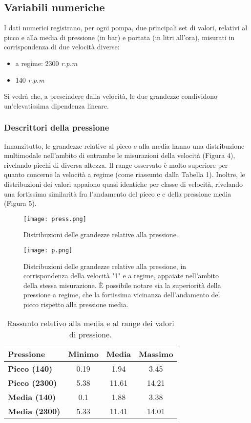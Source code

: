 \documentclass[fleqn,10pt]{SelfArx} %
\begin{document}
\subsection{Variabili numeriche}
I dati numerici registrano, per ogni pompa, due principali set di valori, relativi al picco e alla media di pressione (in bar) e portata (in litri all'ora), misurati in corrispondenza di due velocità diverse:
\begin{itemize}
    \item a regime: 2300 \textit{r.p.m}
    \item 140 \textit{r.p.m}
\end{itemize}
Si vedrà che, a prescindere dalla velocità, le due grandezze condividono un'elevatissima dipendenza lineare.
\subsubsection{Descrittori della pressione}
Innanzitutto, le grandezze relative al picco e alla media hanno una distribuzione multimodale nell'ambito di entrambe le misurazioni della velocità (Figura 4), rivelando picchi di diversa altezza. Il range osservato è molto superiore per quanto concerne la velocità a regime (come riassunto dalla Tabella 1). Inoltre, le distribuzioni dei valori appaiono quasi identiche per classe di velocità, rivelando una fortissima similarità fra l'andamento del picco e e della pressione media (Figura 5).
\begin{figure}[h]
    \centering
    \texttt{[image: press.png]}
    \label{fig:em}
    \caption{Distribuzioni delle grandezze relative alla pressione.}
\end{figure}
\begin{figure}[h]
    \centering
    \texttt{[image: p.png]}
    \label{fig:em}
    \caption{Distribuzioni delle grandezze relative alla pressione, in corrispondenza della velocità "1" e a regime, appaiate nell'ambito della stessa misurazione. È possibile notare sia la superiorità della pressione a regime, che la fortissima vicinanza dell'andamento del picco rispetto alla pressione media.}
\end{figure}
{\begin{table}[h]
\centering
\begin{tabular}[t]{lccc}
\toprule
Pressione&Minimo&Media&Massimo\\
\midrule
\textbf{Picco (140)}&0.19&1.94&3.45\\
\textbf{Picco (2300)}&5.38&11.61&14.21\\
\textbf{Media (140)}&0.1&1.88&3.38\\
\textbf{Media (2300)}&5.33&11.41&14.01\\
\bottomrule
\end{tabular}
\caption{Rassunto relativo alla media e al range dei valori di pressione.}
\end{table}}
\end{document}
